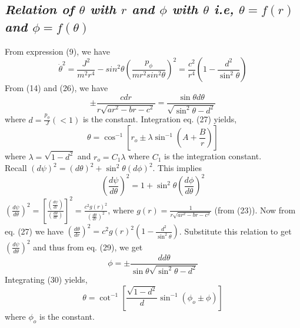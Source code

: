 \documentclass[conference]{IEEEtran}
\begin{document}
\subsection{\emph{\textbf{Relation of $\theta$ with $r$ and $\phi$ with $\theta$ i.e, $\theta = f(r)$ and $\phi = f(\theta)$}}}
From expression (9), we have \begin{dmath}\dot{\theta}^{2} =  \frac{J^2}{m^{2}r^{4}} - sin^{2}{\theta}\left(\frac{p_{\phi}}{mr^{2}sin^{2}{\theta}}\right)^{2} = \frac{c^{2}}{r^{4}}\left(1 - \frac{d^{2}}{\sin^{2}{\theta}}\right)\end{dmath} From (14) and (26), we have \begin{dmath}\pm \frac{c dr}{r\sqrt{ar^{2} - br - c^{2}}} = \frac{\sin{\theta} d\theta}{\sqrt{\sin^{2}{\theta} - d^{2}}}\end{dmath} where $d = \frac{p_{\phi}}{J} \left( < 1\right)$ is the constant. Integration eq. (27) yields, \begin{dmath} \theta = \cos^{-1}{\left[r_{o} \pm \lambda\sin^{-1}{\left(A + \frac{B}{r}\right)}\right]}\end{dmath} where $\lambda = \sqrt{1 - d^{2}}$ and $r_{o} = C_{1}\lambda$ where $C_{1}$ is the integration constant. \\
Recall $\left(d\psi\right)^{2} = \left(d\theta\right)^{2} + \sin^{2}{\theta}\left(d\phi\right)^{2}$. This implies \begin{dmath}\left(\frac{d\psi}{d \theta}\right)^{2} = 1 + \sin^{2}{\theta}\left(\frac{d\phi}{d \theta}\right)^{2}\end{dmath} 
$\left(\frac{d\psi}{d \theta}\right)^{2} = \left[\frac{\left(\frac{d\psi}{d r}\right)}{\left(\frac{d\theta}{d r}\right)}\right]^{2} = \frac{c^{2}g(r)^{2}}{\left(\frac{d\theta}{d r}\right)^{2}}$, where $g(r) = \frac{1}{r\sqrt{ar^{2} - br - c^{2}}}$ (from (23)). Now from eq. (27) we have $\left(\frac{d\theta}{d r}\right)^{2} = c^{2}g(r)^{2}\left(1 - \frac{d^{2}}{\sin^{2}{\theta}}\right)$. Substitute this relation to get $\left(\frac{d\psi}{d \theta}\right)^{2}$ and thus from eq. (29), we get \begin{dmath} \phi = \pm \frac{d  d\theta}{\sin{\theta}{\sqrt{\sin^{2}{\theta} - d^{2}}}}\end{dmath} Integrating (30) yields, \begin{equation}\theta = \cot^{-1}{\left[\frac{\sqrt{1 - d^{2}}}{d}\sin^{-1}{\left(\phi_{o} \pm \phi\right)}\right]}\end{equation} where $\phi_{o}$ is the constant.
\end{document}
